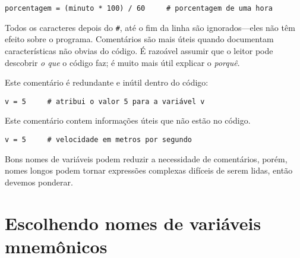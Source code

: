 \beforeverb
\begin{verbatim}
porcentagem = (minuto * 100) / 60     # porcentagem de uma hora
\end{verbatim}
\afterverb
%

Todos os caracteres depois do {\tt \#}, até o fim da linha são ignorados---eles 
não têm efeito sobre o programa.
%
Comentários são mais úteis quando documentam características não obvias 
do código. É razoável assumir que o leitor pode descobrir 
\emph{o que} o código faz; é muito mais útil explicar o \emph{porquê}.  

Este comentário é redundante e inútil dentro do código:

\beforeverb
\begin{verbatim}
v = 5     # atribui o valor 5 para a variável v
\end{verbatim}
\afterverb

Este comentário contem informações úteis que não estão no código.

\beforeverb
\begin{verbatim}
v = 5     # velocidade em metros por segundo
\end{verbatim}
\afterverb

Bons nomes de variáveis podem reduzir a necessidade de comentários, porém, 
nomes longos podem tornar expressões complexas difíceis de serem lidas, então devemos
ponderar. 
 
\section{Escolhendo nomes de variáveis mnemônicos}


